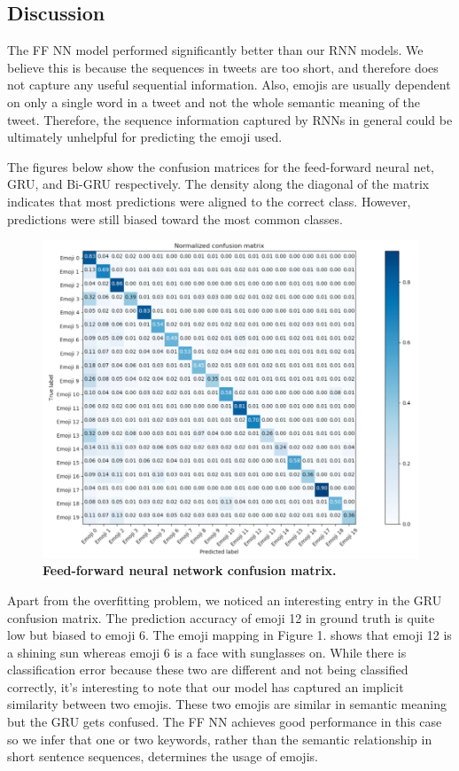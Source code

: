 \documentclass[11pt,a4paper]{article}
\begin{document}
\subsection{Discussion}
	The FF NN model performed significantly better than our RNN models. We believe this is because the sequences in tweets are too short, and therefore does not capture any useful sequential information. Also, emojis are usually dependent on only a single word in a tweet and not the whole semantic meaning of the tweet. Therefore, the sequence information captured by RNNs in general could be ultimately unhelpful for predicting the emoji used.
	\par
	The figures below show the confusion matrices for the feed-forward neural net, GRU, and Bi-GRU respectively. The density along the diagonal of the matrix indicates that most predictions were aligned to the correct class. However, predictions were still biased toward the most common classes.
	\begin{figure}[H]
		\hspace*{-1cm}
		\centering\includegraphics[scale=0.27]{ffnn_confusion} 
		\caption{\textbf{Feed-forward neural network confusion matrix.}}
	\end{figure}
	Apart from the overfitting problem, we noticed an interesting entry in the GRU confusion matrix. The prediction accuracy of emoji 12 in ground truth is quite low but biased to emoji 6. The emoji mapping in Figure 1. shows that emoji 12 is a shining sun whereas emoji 6 is a face with sunglasses on. While there is classification error because these two are different and not being classified correctly, it's interesting to note that our model has captured an implicit similarity between two emojis. These two emojis are similar in semantic meaning but the GRU gets confused. The FF NN achieves good performance in this case so we infer that one or two keywords, rather than the semantic relationship in short sentence sequences, determines the usage of emojis. 
	
\end{document}
